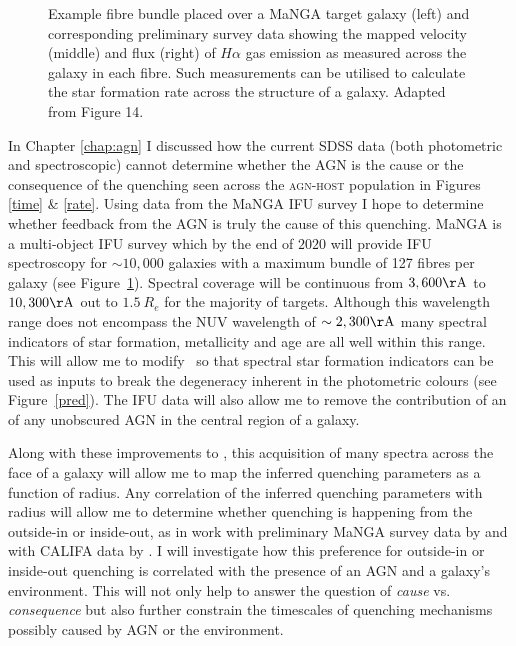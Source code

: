 \begin{figure}
\caption[Example MaNGA fibre bundle on a target galaxy with example emission data]{Example fibre bundle placed over a MaNGA target galaxy (left) and corresponding preliminary survey data showing the mapped velocity (middle) and flux (right) of $H\alpha$ gas emission as measured across the galaxy in each fibre. Such measurements can be utilised to calculate the star formation rate across the structure of a galaxy. Adapted from \cite{bundy15} Figure 14.}
\label{fig:manga}
\end{figure}

In Chapter \ref{chap:agn} I discussed how the current SDSS data (both photometric and spectroscopic) cannot determine whether the AGN is the cause or the consequence of the quenching seen across the \textsc{agn-host} population in Figures \ref{time} \& \ref{rate}. Using data from the MaNGA IFU survey \citep{bundy15} I hope to determine whether feedback from the AGN is truly the cause of this quenching. MaNGA is a multi-object IFU survey which by the end of $2020$ will provide IFU spectroscopy for $\sim10,000$ galaxies with a maximum bundle of 127 fibres per galaxy (see Figure~\ref{fig:manga}). Spectral coverage will be continuous from $3,600\rm{\AA}$ to $10,300\rm{\AA}$ out to $1.5~R_e$ for the majority of targets. Although this wavelength range does not encompass the NUV wavelength of $\sim2,300\rm{\AA}$ many spectral indicators of star formation, metallicity and age are all well within this range. This will allow me to modify \starpy\ so that spectral star formation indicators \citep[such as $H\alpha$;][]{kennicutt94} can be used as inputs to break the degeneracy inherent in the photometric colours (see Figure~\ref{pred}). The IFU data will also allow me to remove the contribution of an of any unobscured AGN in the central region of a galaxy. 

Along with these improvements to \starpy, this acquisition of many spectra across the face of a galaxy will allow me to map the inferred quenching parameters as a function of radius. Any correlation of the inferred quenching parameters with radius will allow me to determine whether quenching is happening from the outside-in \citep[i.e. due to environmental mechanisms, as in][]{pan15, clarke16, schaefer17} or inside-out, as in work with preliminary MaNGA survey data by \citet{belfiore16} and with CALIFA data by \citet{gonzalez16}. I will investigate how this preference for outside-in or inside-out quenching is correlated with the presence of an AGN and a galaxy's environment. This will not only help to answer the question of \emph{cause} vs. \emph{consequence} but also further constrain the timescales of quenching mechanisms possibly caused by AGN or the environment. 

